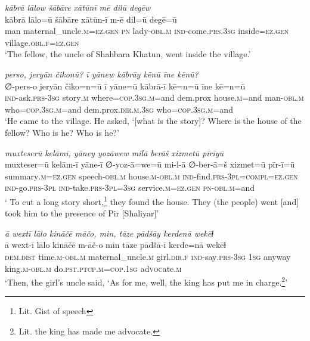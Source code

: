 \ea \label{ŽP.203}
\textit{kābrā lālow šābāre xātūnī mē dilū degēw} \\ 
\gll kābrā lālo=ū šābāre xātūn-ī m-ē dil=ū degē=ū \\ 
 man maternal\_uncle\textsc{.m}\textsc{\textsc{=ez.gen}} \textsc{pn} lady\textsc{-obl}\textsc{.m} \textsc{ind-}come\textsc{.prs}\textsc{.3sg} inside\textsc{\textsc{=ez.gen}} village\textsc{.obl}\textsc{.f}\textsc{\textsc{=ez.gen}} \\ 
\glt `The fellow, the uncle of Shahbara Khatun, went inside the village.'
\z 
 
\ea \label{ŽP.204}
\textit{perso, jeryān čikonū? ī yānew kābrāy kēnū īne kēnū?} \\ 
\gll ∅-pers-o jeryān čiko=n=ū ī yāne=ū kābrā-ī kē=n=ū īne kē=n=ū \\ 
 \textsc{ind-}ask\textsc{.prs}\textsc{-3sg} story\textsc{.m} where\textsc{=cop}\textsc{.3sg}\textsc{.m}=and dem.prox house\textsc{.m}=and man\textsc{-obl}\textsc{.m} who\textsc{=cop}\textsc{.3sg}\textsc{.m}=and dem.prox\textsc{.dir}\textsc{.m}\textsc{.3sg} who\textsc{=cop}\textsc{.3sg}\textsc{.m}=and \\ 
\glt `He came to the village. He asked, ‘[what is the story]? Where is the house of the fellow? Who is he? Who is he?'
\z 
 
\ea \label{ŽP.205}
\textit{muxteserū kelāmī, yāney yozāwew milā berāš xizmetū pīrīyū} \\ 
\gll muxteser=ū kelām-ī yāne-ī ∅-yoz-ā=we=ū mi-l-ā ∅-ber-ā=š xizmet=ū pīr-ī=ū \\ 
 summary\textsc{.m}\textsc{\textsc{=ez.gen}} speech\textsc{-obl}\textsc{.m} house\textsc{.m}\textsc{-obl}\textsc{.m} \textsc{ind-}find\textsc{.prs}\textsc{-3pl}\textsc{=compl}\textsc{\textsc{=ez.gen}} \textsc{ind-}go\textsc{.prs}\textsc{-3pl} \textsc{ind-}take\textsc{.prs}\textsc{-3pl}\textsc{=3sg} service\textsc{.m}\textsc{\textsc{=ez.gen}} \textsc{pn}\textsc{-obl}\textsc{.m}=and \\ 
\glt ` To cut a long story short,\footnote{Lit. Gist of speech} they found the house. They (the people) went [and] took him to the presence of Pir [Shaliyar]'
\z 
 
\ea \label{ŽP.206}
\textit{ā wextī lālo kināčē māčo, min, tāze pādšāy kerdenā wekēɫ} \\ 
\gll ā wext-ī lālo kināčē m-āč-o min tāze pādšā-ī kerde=nā wekēɫ \\ 
 \textsc{dem.dist} time\textsc{.m}\textsc{-obl}\textsc{.m} maternal\_uncle\textsc{.m} girl\textsc{.dir}\textsc{.f} \textsc{ind-}say\textsc{.prs}\textsc{-3sg} \textsc{1sg} anyway king\textsc{.m}\textsc{-obl}\textsc{.m} do\textsc{.pst}\textsc{.ptcp}\textsc{.m}\textsc{=cop}\textsc{.\textsc{1sg}} ad\textsc{voc}ate\textsc{.m} \\ 
\glt `Then, the girl’s uncle said, ‘As for me, well, the king has put me in charge.\footnote{Lit. the king has made me advocate.}'
\z 
 

